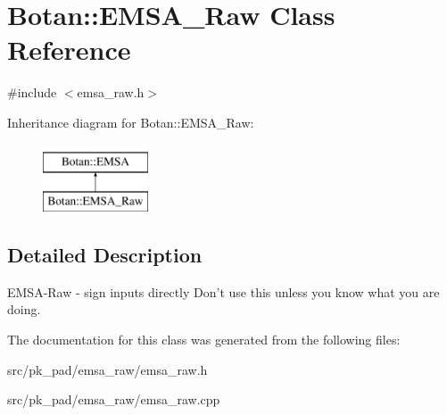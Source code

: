 \hypertarget{classBotan_1_1EMSA__Raw}{\section{Botan\-:\-:E\-M\-S\-A\-\_\-\-Raw Class Reference}
\label{classBotan_1_1EMSA__Raw}
}


{\ttfamily \#include $<$emsa\-\_\-raw.\-h$>$}

Inheritance diagram for Botan\-:\-:E\-M\-S\-A\-\_\-\-Raw\-:\begin{figure}[H]
\begin{center}
\leavevmode
\includegraphics[height=2.000000cm]{classBotan_1_1EMSA__Raw}
\end{center}
\end{figure}


\subsection{Detailed Description}
E\-M\-S\-A-\/\-Raw -\/ sign inputs directly Don't use this unless you know what you are doing. 

The documentation for this class was generated from the following files\-:\begin{DoxyCompactItemize}
\item 
src/pk\-\_\-pad/emsa\-\_\-raw/emsa\-\_\-raw.\-h\item 
src/pk\-\_\-pad/emsa\-\_\-raw/emsa\-\_\-raw.\-cpp\end{DoxyCompactItemize}
